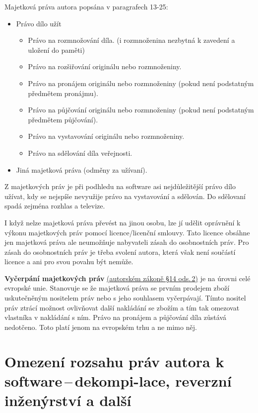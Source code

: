Majetková práva autora popsána v paragrafech 13-25:
\begin{itemize}[noitemsep]
    \item Právo dílo užít
    \begin{itemize}[noitemsep]
        \item Právo na rozmnožování díla. (i rozmnoženina nezbytná k zavedení a uložení do paměti)
        \item Právo na rozšiřování originálu nebo rozmnoženiny.
        \item Právo na pronájem originálu nebo rozmnoženiny (pokud není podstatným předmětem pronájmu).
        \item Právo na půjčování originálu nebo rozmnoženiny (pokud není podstatným předmětem půjčování).
        \item Právo na vystavování originálu nebo rozmnoženiny.
        \item Právo na sdělování díla veřejnosti.
    \end{itemize}
    \item Jiná majetková práva (odměny za užívaní).
\end{itemize}

Z majetkových práv je při podhledu na software asi nejdůležitější právo dílo užívat, kdy se nejspíše nevyužije právo na vystavování a sdělován. Do sdělovaní spadá zejména rozhlas a televize.

I když nelze majetková práva převést na jinou osobu, lze jí udělit oprávnění k výkonu majetkových práv pomocí licence/licenční smlouvy. Tato licence obsáhne jen majetková práva ale neumožňuje nabyvateli zásah do osobnostních práv. Pro zásah do osobnostních práv je třeba svolení autora, která však není součástí licence a ani pro svou povahu být nemůže.   

\textbf{Vyčerpání majetkových práv} \href{https://www.zakonyprolidi.cz/cs/2000-121#p14-2}{(autorském zákoně §14 ods.\,2)} je na úrovni celé evropské unie. Stanovuje se že majetková práva se prvním prodejem zboží uskutečněným nositelem práv nebo s jeho souhlasem vyčerpávají. Tímto nositel práv ztrácí možnost ovlivňovat další nakládání se zbožím a tím tak omezovat vlastníka v nakládání s ním. Právo na pronájem a půjčování díla zůstává nedotčeno. Toto platí jenom na evropském trhu a ne mimo něj.










\newpage
\section[Omezení rozsahu práv autora k software\,--\,dekompilace, reverzní inženýrství a další]{Omezení rozsahu práv autora k software\,--\,dekompi-lace, reverzní inženýrství a další}

